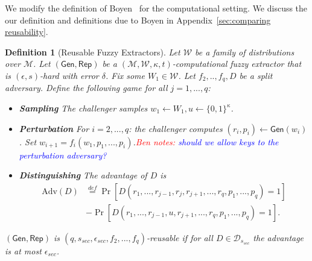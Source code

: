 \documentclass[11pt]{article}
\newcommand{\apref}[1]{\mbox{Appendix~\ref{#1}}}
\newcommand{\class}[1]{{\ensuremath{\mathsf{#1}}}}
\newcommand{\gen}{\ensuremath{\class{Gen}}\xspace}
\newcommand{\rep}{\ensuremath{\class{Rep}}\xspace}
\newcommand{\zo}{\ensuremath{\{0, 1\}}}
\newtheorem{definition}[theorem]{Definition}
\newcommand{\authnote}[2]{{\textcolor{red}{\textsf{#1 notes: }\textcolor{blue}{ #2}}\marginpar{\textcolor{red}{\textbf{!!!!!}}}}}
\newcommand{\authnote}[2]{}
\newcommand{\bnote}[1]{{\authnote{Ben}{#1}}}
\begin{document}
We modify the definition of Boyen~\cite[Definition 6]{Boyen2004} for the computational setting.  We discuss the our definition and definitions due to Boyen in \apref{sec:comparing reusability}.

\begin{definition}[Reusable Fuzzy Extractors]
\label{def:outsider fuzz ext}
Let $\mathcal{W}$ be a family of distributions over $\mathcal{M}$.  Let $(\gen, \rep)$ be a $(\mathcal{M}, \mathcal{W}, \kappa, t)$-computational fuzzy extractor that is $(\epsilon, s)$-hard with error $\delta$.
Fix some $W_1 \in \mathcal{W}$.  Let $f_2,.., f_q , D$ be a split adversary.  Define the following game for all $j=1,..., q$:
\begin{itemize}%
\item \textbf{Sampling} The challenger samples $w_1\leftarrow W_1, u\leftarrow \zo^\kappa$.
\item \textbf{Perturbation} For $i=2,..., q$: the challenger computes $(r_i, p_i)\leftarrow \gen(w_i)$.  Set $w_{i+1} = f_i(w_1, p_1,..., p_i)$.\bnote{should we allow keys to the perturbation adversary?}
\item \textbf{Distinguishing} The advantage of $D$ is
\begin{align*}
\text{Adv}(D)&\overset{def}= \Pr[D(r_1,..., r_{j-1}, r_j, r_{j+1},..., r_q, p_1,..., p_q)=1]\\ &- \Pr[D(r_1,..., r_{j-1}, u, r_{j+1},..., r_q, p_1,..., p_q)=1].
\end{align*}
\end{itemize}
$(\gen, \rep)$ is $(q, s_{sec}, \epsilon_{sec}, f_2,..., f_q)$-reusable if for all $D\in\mathcal{D}_{s_{sec}}$ the advantage is at most $\epsilon_{sec}$.
\end{definition}
\end{document}
